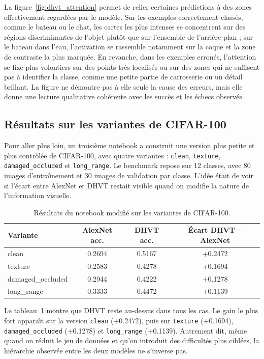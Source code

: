 \documentclass[11pt,a4paper]{article}
\begin{document}
La figure~\ref{fig:dhvt_attention} permet de relier certaines pr\'edictions \`a des zones effectivement regard\'ees par le mod\`ele. Sur les exemples correctement class\'es, comme le bateau ou le chat, les cartes les plus intenses se concentrent sur des r\'egions discriminantes de l'objet plut\^ot que sur l'ensemble de l'arri\`ere-plan ; sur le bateau dans l'eau, l'activation se rassemble notamment sur la coque et la zone de contraste la plus marqu\'ee. En revanche, dans les exemples erron\'es, l'attention se fixe plus volontiers sur des points tr\`es localis\'es ou sur des zones qui ne suffisent pas \`a identifier la classe, comme une petite partie de carrosserie ou un d\'etail brillant. La figure ne d\'emontre pas \`a elle seule la cause des erreurs, mais elle donne une lecture qualitative coh\'erente avec les succ\`es et les \'echecs observ\'es.

\subsection{R\'esultats sur les variantes de CIFAR-100}
Pour aller plus loin, un troisi\`eme notebook a construit une version plus petite et plus contr\^ol\'ee de CIFAR-100, avec quatre variantes : \texttt{clean}, \texttt{texture}, \texttt{damaged\_occluded} et \texttt{long\_range}. Le benchmark repose sur 12 classes, avec 80 images d'entra\^\i nement et 30 images de validation par classe. L'id\'ee \'etait de voir si l'\'ecart entre AlexNet et DHVT restait visible quand on modifie la nature de l'information visuelle.

\begin{table}[H]
\centering
\begin{tabular}{>{\raggedright\arraybackslash}p{3.4cm}ccc}
\toprule
Variante & AlexNet acc. & DHVT acc. & \'Ecart DHVT -- AlexNet \\
\midrule
clean & 0.2694 & 0.5167 & +0.2472 \\
texture & 0.2583 & 0.4278 & +0.1694 \\
damaged\_occluded & 0.2944 & 0.4222 & +0.1278 \\
long\_range & 0.3333 & 0.4472 & +0.1139 \\
\bottomrule
\end{tabular}
\caption{R\'esultats du notebook modifi\'e sur les variantes de CIFAR-100.}
\label{tab:variant_results}
\end{table}

Le tableau~\ref{tab:variant_results} montre que DHVT reste au-dessus dans tous les cas. Le gain le plus fort appara\^\i t sur la version \texttt{clean} (+0.2472), puis sur \texttt{texture} (+0.1694), \texttt{damaged\_occluded} (+0.1278) et \texttt{long\_range} (+0.1139). Autrement dit, m\^eme quand on r\'eduit le jeu de donn\'ees et qu'on introduit des difficult\'es plus cibl\'ees, la hi\'erarchie observ\'ee entre les deux mod\`eles ne s'inverse pas.
\end{document}
